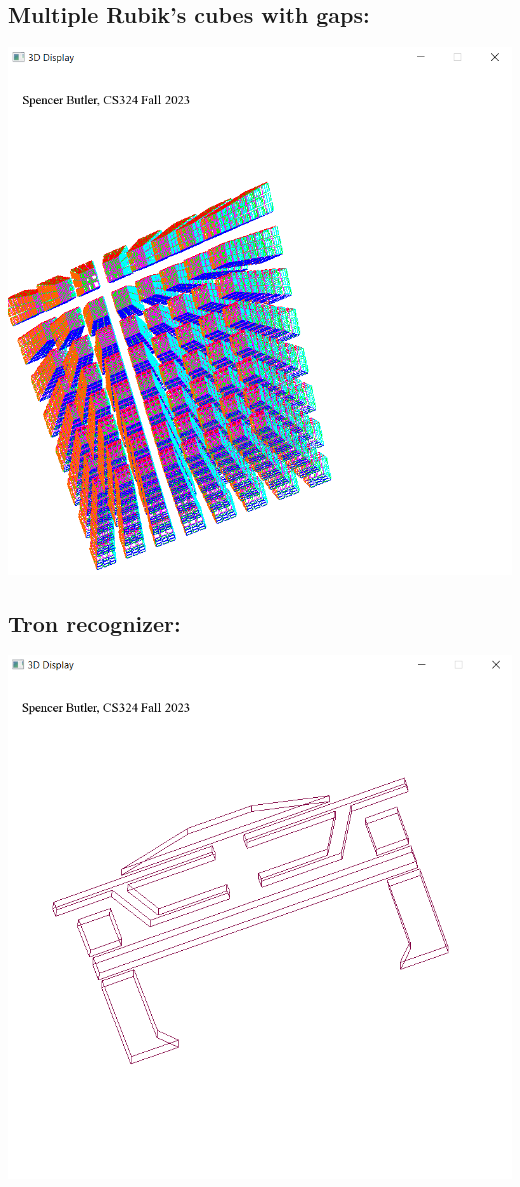 \documentclass[12pt]{article}
\begin{document}
\subsection{Multiple Rubik's cubes with gaps:}
\noindent \includegraphics{img/3}
\subsection{Tron recognizer:}
\noindent \includegraphics{img/4}
\end{document}
